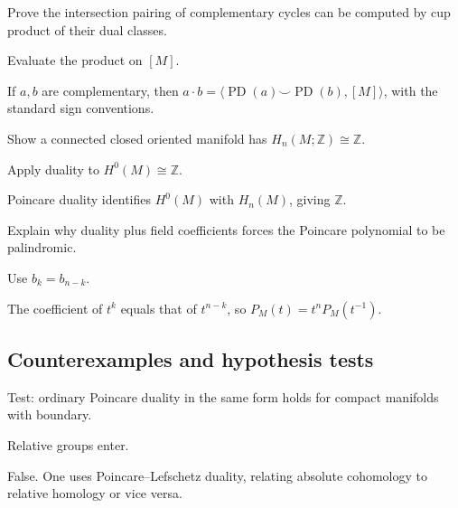 \begin{exercise}\label{exr:viii33-ped-07}
Prove the intersection pairing of complementary cycles can be computed by cup product of their dual classes.
\end{exercise}
\begin{hint}
Evaluate the product on $[M]$.
\end{hint}
\begin{solution}
If $a,b$ are complementary, then $a\cdot b=\langle \operatorname{PD}(a)\smile\operatorname{PD}(b),[M]\rangle$, with the standard sign conventions.
\end{solution}

\begin{exercise}\label{exr:viii33-ped-08}
Show a connected closed oriented manifold has $H_n(M;\mathbb Z)\cong\mathbb Z$.
\end{exercise}
\begin{hint}
Apply duality to $H^0(M)\cong\mathbb Z$.
\end{hint}
\begin{solution}
Poincare duality identifies $H^0(M)$ with $H_n(M)$, giving $\mathbb Z$.
\end{solution}

\begin{exercise}\label{exr:viii33-ped-09}
Explain why duality plus field coefficients forces the Poincare polynomial to be palindromic.
\end{exercise}
\begin{hint}
Use $b_k=b_{n-k}$.
\end{hint}
\begin{solution}
The coefficient of $t^k$ equals that of $t^{n-k}$, so $P_M(t)=t^nP_M(t^{-1})$.
\end{solution}

\subsection*{Counterexamples and hypothesis tests}

\begin{exercise}\label{exr:viii33-ped-10}
Test: ordinary Poincare duality in the same form holds for compact manifolds with boundary.
\end{exercise}
\begin{hint}
Relative groups enter.
\end{hint}
\begin{solution}
False. One uses Poincare--Lefschetz duality, relating absolute cohomology to relative homology or vice versa.
\end{solution}

